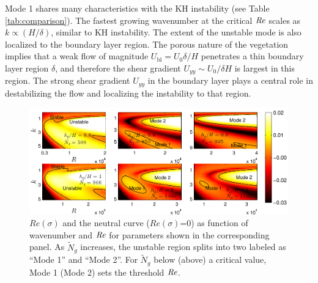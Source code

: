 \documentclass{jfm}
\newcommand{\Ndg}{\tilde{N}_g}
\newcommand{\ubl}{U_\text{bl}}
\begin{document}
Mode 1 shares many characteristics with the KH instability (see Table \ref{tab:comparison}). 
The fastest growing wavenumber at the critical $\mbox{\textit{Re}}$ scales as $k \propto (H/\delta)$, similar to KH instability. 
The extent of the unstable mode is also localized to the boundary layer region.
The porous nature of the vegetation implies that a weak flow of magnitude $\ubl = U_0 \delta/H$ penetrates a thin boundary layer region $\delta$, and therefore the shear gradient $U_{yy} \sim U_0/\delta H$ is largest in this region. 
The strong shear gradient $U_{yy}$ in the boundary layer plays a central role in destabilizing the flow and localizing the instability to that region. 
\begin{figure}
 \includegraphics[width=\textwidth]{SetAll_imgsc}

\caption{
$Re(\sigma)$ and the neutral curve ($Re(\sigma)$=0) as function of wavenumber and $\mbox{\textit{Re}}$ for parameters shown in the corresponding panel.  
As $\Ndg$ increases, the unstable region splits into two labeled as ``Mode 1'' and ``Mode 2''. 
For $\Ndg$ below (above) a critical value, Mode 1 (Mode 2) sets the threshold $\mbox{\textit{Re}}$.
}
\label{K_Re_sigma_set3}
\end{figure}
\end{document}
